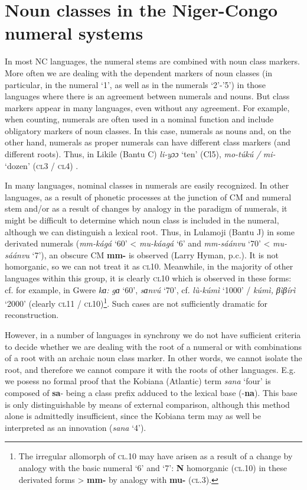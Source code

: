 \chapter{Noun classes in the Niger-Congo numeral systems} 
In most NC languages, the numeral stems are combined with noun class markers. More often we are dealing with the dependent markers of noun classes (in particular, in the numeral `1', as well as in the numerals `2'-'5') in those languages where there is an agreement between numerals and nouns. But class markers appear in many languages, ​​even without any agreement. For example, when counting, numerals are often used in a nominal function and include obligatory markers of noun classes. In this case, numerals as nouns and, on the other hand, numerals as proper numerals can have different class markers (and different roots). Thus, in Likile (Bantu C) \textit{li-yɔɔ} `ten' (Cl5), \textit{mo-túkú} \textit{/} \textit{mi-} {`dozen'} (\textsc{cl}3 / \textsc{cl}4) \citep{Carrington1977}.

In many languages, nominal classes in numerals are easily recognized. In other languages, as a result of phonetic processes at the junction of CM and numeral stem and/or as a result of changes by analogy in the paradigm of numerals, it might be difficult to determine which noun class is included in the numeral, although we can distinguish a lexical root. Thus, in Lulamoji (Bantu J) in some derivated numerals (\textit{mm-kágá} `60' < \textit{mu-káagá} `6' and \textit{mm-sáánvu} `70' < \textit{mu-sáánvu} `7'), an obscure CM \textbf{mm-} is observed (Larry Hyman, p.c.). It is not homorganic, so we can not treat it as \textsc{cl}10. Meanwhile, in the majority of other languages within this group, it is clearly \textsc{cl}10 which is observed in these forms: cf. for example, in Gwere \textit{{}kɑ:} \textit{gɑ} `60', \textit{{}sɑnvú} `70', cf. \textit{lù-kúmì} `1000' / \textit{{}kúmì, } \textit{βìβírì} `2000' (clearly \textsc{cl}11 / \textsc{cl}10)\footnote{The irregular allomorph of \textsc{cl}.10 may have arisen as a result of a change by analogy with the basic numeral `6' and `7': \textbf{N} homorganic (\textsc{cl}.10) in these derivated forms > \textbf{mm-} by analogy with \textbf{mu-} (\textsc{cl}.3).}. Such cases are not sufficiently dramatic for reconstruction.

However, in a number of languages in synchrony we do not have sufficient criteria to decide whether we are dealing with the root of a numeral or with combinations of a root with an archaic noun class marker. In other words, we cannot isolate the root, and therefore we cannot compare it with the roots of other languages. E.g. we posess no formal proof that the Kobiana (Atlantic) term \textit{sana} ‘four’ is composed of \textbf{sa}- being a class prefix adduced to the lexical base (-\textbf{na}). This base is only distinguishable by means of external comparison, although this method alone is admittedly  insufficient, since the Kobiana term may as well be interpreted as an innovation (\textit{sana} ‘4’). 

